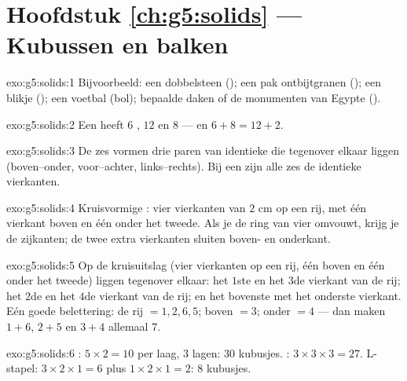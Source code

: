 \section*{Hoofdstuk \ref{ch:g5:solids} --- Kubussen en balken}

\begin{solution}{exo:g5:solids:1}
Bijvoorbeeld: een dobbelsteen (); een pak ontbijtgranen (); een
blikje (); een voetbal (bol); bepaalde daken of de monumenten van
Egypte ().
\end{solution}

\begin{solution}{exo:g5:solids:2}
Een  heeft $6$ , $12$  en $8$  --- en
$6 + 8 = 12 + 2$. \checkmark
\end{solution}

\begin{solution}{exo:g5:solids:3}
De zes  vormen drie paren van identieke  die tegenover
elkaar liggen (boven--onder, voor--achter, links--rechts). Bij een  zijn
alle zes de  identieke vierkanten.
\end{solution}

\begin{solution}{exo:g5:solids:4}
Kruisvormige : vier vierkanten van $2$ cm op een rij, met één vierkant
boven en één onder het tweede. Als je de ring van vier omvouwt, krijg je de
zijkanten; de twee extra vierkanten sluiten boven- en onderkant.
\end{solution}

\begin{solution}{exo:g5:solids:5}
Op de kruisuitslag (vier vierkanten op een rij, één boven en één onder het
tweede) liggen tegenover elkaar: het $1$ste en het $3$de vierkant van de rij;
het $2$de en het $4$de vierkant van de rij; en het bovenste met het onderste
vierkant. Eén goede belettering: de rij $= 1, 2, 6, 5$; boven $= 3$; onder
$= 4$ --- dan maken $1{+}6$, $2{+}5$ en $3{+}4$ allemaal $7$.
\end{solution}

\begin{solution}{exo:g5:solids:6}
: $5 \times 2 = 10$ per laag, $3$ lagen: $30$ kubusjes. :
$3 \times 3 \times 3 = 27$. L-stapel: $3 \times 2 \times 1 = 6$ plus
$1 \times 2 \times 1 = 2$: $8$ kubusjes.
\end{solution}

